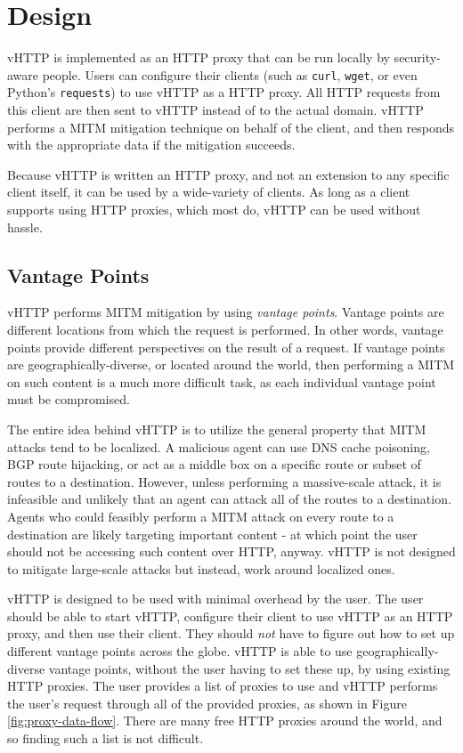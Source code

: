 \section{Design}
\label{sec:design}

vHTTP is implemented as an HTTP proxy that can be run locally by security-aware
people. Users can configure their clients (such as \texttt{curl},
\texttt{wget}, or even Python's \texttt{requests}) to use vHTTP as a HTTP
proxy. All HTTP requests from this client are then sent to vHTTP instead of
to the actual domain. vHTTP performs a MITM mitigation technique on behalf of
the client, and then responds with the appropriate data if the mitigation
succeeds.

Because vHTTP is written an HTTP proxy, and not an extension to any specific
client itself, it can be used by a wide-variety of clients. As long as a client
supports using HTTP proxies, which most do, vHTTP can be used without hassle.

\subsection{Vantage Points}

vHTTP performs MITM mitigation by using \textit{vantage points}. Vantage points
are different locations from which the request is performed. In other words,
vantage points provide different perspectives on the result of a request. If
vantage points are geographically-diverse, or located around the world, then
performing a MITM on such content is a much more difficult task, as each
individual vantage point must be compromised.

The entire idea behind vHTTP is to utilize the general property that MITM
attacks tend to be localized. A malicious agent can use DNS cache poisoning,
BGP route hijacking, or act as a middle box on a specific route or subset of
routes to a destination. However, unless performing a massive-scale attack, it
is infeasible and unlikely that an agent can attack all of the routes to a
destination. Agents who could feasibly perform a MITM attack on every route to
a destination are likely targeting important content - at which point the user
should not be accessing such content over HTTP, anyway. vHTTP is not designed
to mitigate large-scale attacks but instead, work around localized ones.

vHTTP is designed to be used with minimal overhead by the user. The user should
be able to start vHTTP, configure their client to use vHTTP as an HTTP proxy,
and then use their client. They should \emph{not} have to figure out how to set
up different vantage points across the globe. vHTTP is able to use
geographically-diverse vantage points, without the user having to set these up,
by using existing HTTP proxies. The user provides a list of proxies to use and
vHTTP performs the user's request through all of the provided proxies, as shown
in Figure \ref{fig:proxy-data-flow}. There are many free HTTP proxies around
the world, and so finding such a list is not difficult.

